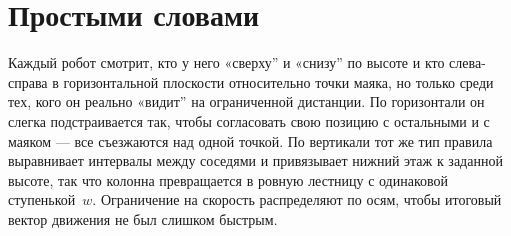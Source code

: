 \documentclass[12pt,a4paper]{article}
\begin{document}
\section*{Простыми словами}

Каждый робот смотрит, кто у него «сверху'' и «снизу'' по высоте и кто слева-справа в горизонтальной плоскости относительно точки маяка, но только среди тех, кого он реально «видит'' на ограниченной дистанции. По горизонтали он слегка подстраивается так, чтобы согласовать свою позицию с остальными и с маяком --- все съезжаются над одной точкой. По вертикали тот же тип правила выравнивает интервалы между соседями и привязывает нижний этаж к заданной высоте, так что колонна превращается в ровную лестницу с одинаковой ступенькой~$w$. Ограничение на скорость распределяют по осям, чтобы итоговый вектор движения не был слишком быстрым.
\end{document}
